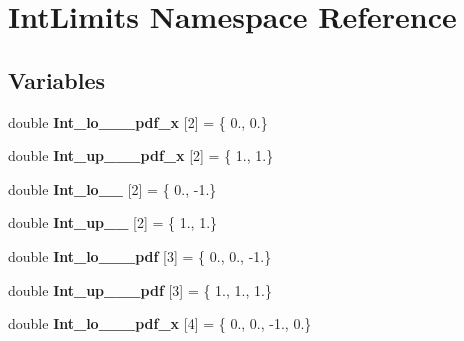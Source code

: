\hypertarget{namespaceIntLimits}{\section{Int\-Limits Namespace Reference}
\label{namespaceIntLimits}
}
\subsection*{Variables}
\begin{DoxyCompactItemize}
\item 
\hypertarget{namespaceIntLimits_afb5256e0acbcc4a075b95c9c79ed3be7}{double {\bfseries Int\-\_\-lo\-\_\-\_\-\_\-pdf\-\_\-x} \mbox{[}2\mbox{]} = \{ 0., 0.\}}\label{namespaceIntLimits_afb5256e0acbcc4a075b95c9c79ed3be7}

\item 
\hypertarget{namespaceIntLimits_a88f13c3711e3d995a311b3b63ee427b8}{double {\bfseries Int\-\_\-up\-\_\-\_\-\_\-pdf\-\_\-x} \mbox{[}2\mbox{]} = \{ 1., 1.\}}\label{namespaceIntLimits_a88f13c3711e3d995a311b3b63ee427b8}

\item 
\hypertarget{namespaceIntLimits_abea5d83ca81d125c3bfe744f15dde530}{double {\bfseries Int\-\_\-lo\-\_\-\_} \mbox{[}2\mbox{]} = \{ 0., -\/1.\}}\label{namespaceIntLimits_abea5d83ca81d125c3bfe744f15dde530}

\item 
\hypertarget{namespaceIntLimits_af96e60fc225282d80606ca70991b8068}{double {\bfseries Int\-\_\-up\-\_\-\_} \mbox{[}2\mbox{]} = \{ 1., 1.\}}\label{namespaceIntLimits_af96e60fc225282d80606ca70991b8068}

\item 
\hypertarget{namespaceIntLimits_abcc37e434e81507b78bdcde1745131b7}{double {\bfseries Int\-\_\-lo\-\_\-\_\-\_\-pdf} \mbox{[}3\mbox{]} = \{ 0., 0., -\/1.\}}\label{namespaceIntLimits_abcc37e434e81507b78bdcde1745131b7}

\item 
\hypertarget{namespaceIntLimits_a1214aaf3a96dc285a487625dfd6393c6}{double {\bfseries Int\-\_\-up\-\_\-\_\-\_\-pdf} \mbox{[}3\mbox{]} = \{ 1., 1., 1.\}}\label{namespaceIntLimits_a1214aaf3a96dc285a487625dfd6393c6}

\item 
\hypertarget{namespaceIntLimits_a4fdb20b301099bd283171972017c065f}{double {\bfseries Int\-\_\-lo\-\_\-\_\-\_\-pdf\-\_\-x} \mbox{[}4\mbox{]} = \{ 0., 0., -\/1., 0.\}}\label{namespaceIntLimits_a4fdb20b301099bd283171972017c065f}


\end{DoxyCompactItemize}
